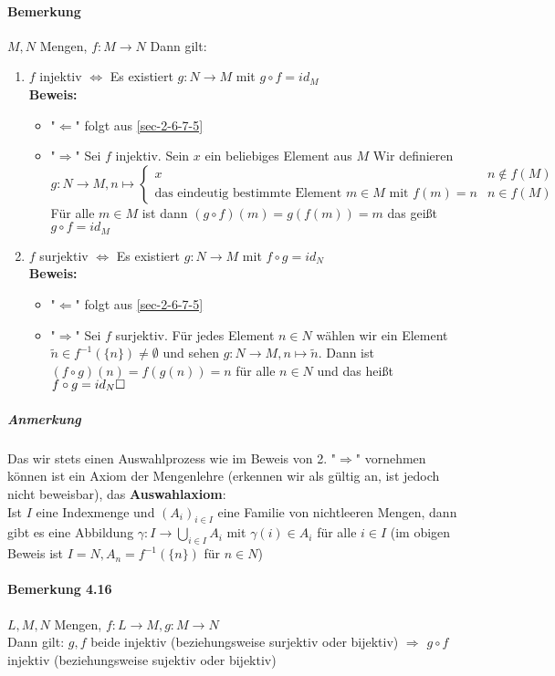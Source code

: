 \documentclass[a4paper]{scrartcl}
\begin{document}
\paragraph{Bemerkung}
\label{sec-2-6-7-7}
$M,N$ Mengen, $f:M\to N$ Dann gilt:
\begin{enumerate}
\item $f$ injektiv $\Leftrightarrow$ Es existiert $g:N\to M$ mit $g\circ f = id_M$ \\
        \textbf{Beweis:}
\begin{itemize}
\item "$\Leftarrow$" folgt aus \ref{sec-2-6-7-5}
\item "$\Rightarrow$" Sei $f$ injektiv. Sein $x$ ein beliebiges Element aus $M$
          Wir definieren \[g:N\to M,n\mapsto \begin{cases} x & n\not\in f(M) \\ \text{das eindeutig bestimmte Element $m\in M$ mit $f(m) = n$} & n\in f(M) \end{cases}\]
          Für alle $m\in M$ ist dann $(g\circ f)(m) = g(f(m)) = m$ das geißt $g\circ f = id_M$
\end{itemize}
\item $f$ surjektiv $\Leftrightarrow$ Es existiert $g:N\to M$ mit $f\circ g = id_N$ \\
        \textbf{Beweis:}
\begin{itemize}
\item "$\Leftarrow$" folgt aus \ref{sec-2-6-7-5}
\item "$\Rightarrow$" Sei $f$ surjektiv. Für jedes Element $n\in N$ wählen wir ein Element $\tilde n\in f^{-1}(\{n\}) \neq \emptyset$ und sehen
$g:N\to M,n\mapsto \tilde n$. Dann ist $(f\circ g)(n) = f(g(n)) = n$ für alle $n\in N$ und das heißt $f\circ g = id_N \hfill\square$
\end{itemize}
\end{enumerate}
\subparagraph{Anmerkung}
\label{sec-2-6-7-7-1}
Das wir stets einen Auswahlprozess wie im Beweis von 2. "$\Rightarrow$" vornehmen können ist ein Axiom der Mengenlehre (erkennen wir als gültig an, ist jedoch nicht beweisbar), das \textbf{Auswahlaxiom}: \\
      Ist $I$ eine Indexmenge und $(A_i)_{i\in I}$ eine Familie von nichtleeren Mengen, dann gibt es eine Abbildung $\gamma:I\to \bigcup_{i\in I} A_i$ mit $\gamma (i) \in A_i$ für alle $i\in I$ (im obigen Beweis ist $I = N,A_n = f^{-1}(\{n\})$ für $n\in N$)
\paragraph{Bemerkung 4.16}
\label{sec-2-6-7-8}
$L,M,N$ Mengen, $f:L\to M, g:M\to N$ \\
     Dann gilt: $g,f$ beide injektiv (beziehungsweise surjektiv oder bijektiv) $\Rightarrow$ $g\circ f$ injektiv (beziehungsweise sujektiv oder bijektiv)
\end{document}
